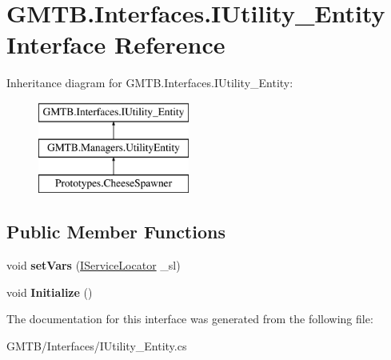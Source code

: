 \hypertarget{interface_g_m_t_b_1_1_interfaces_1_1_i_utility___entity}{}\section{G\+M\+T\+B.\+Interfaces.\+I\+Utility\+\_\+\+Entity Interface Reference}
\label{interface_g_m_t_b_1_1_interfaces_1_1_i_utility___entity}
Inheritance diagram for G\+M\+T\+B.\+Interfaces.\+I\+Utility\+\_\+\+Entity\+:\begin{figure}[H]
\begin{center}
\leavevmode
\includegraphics[height=3.000000cm]{interface_g_m_t_b_1_1_interfaces_1_1_i_utility___entity}
\end{center}
\end{figure}
\subsection*{Public Member Functions}
\begin{DoxyCompactItemize}
\item 
\mbox{\label{interface_g_m_t_b_1_1_interfaces_1_1_i_utility___entity_a6b63f84207be5dd387874f5d850d08b6}} 
void {\bfseries set\+Vars} (\mbox{\hyperlink{interface_g_m_t_b_1_1_interfaces_1_1_i_service_locator}{I\+Service\+Locator}} \+\_\+sl)
\item 
\mbox{\label{interface_g_m_t_b_1_1_interfaces_1_1_i_utility___entity_ab26780820125aec976e98488d5829266}} 
void {\bfseries Initialize} ()
\end{DoxyCompactItemize}


The documentation for this interface was generated from the following file\+:\begin{DoxyCompactItemize}
\item 
G\+M\+T\+B/\+Interfaces/I\+Utility\+\_\+\+Entity.\+cs\end{DoxyCompactItemize}
